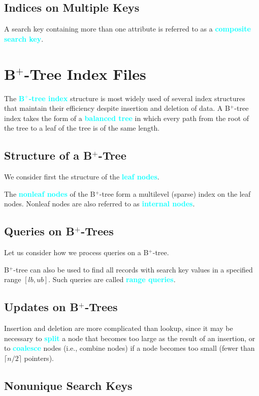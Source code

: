 \documentclass[a4paper,12pt,twoside,openany]{book}
\newcommand{\textcy}[1]{\textbf{\textcolor{cyan}{#1}}}
\begin{document}
\subsection{Indices on Multiple Keys}

A search key containing more than one attribute is referred to as a \textcy{composite search key}.

\section{B$^+$-Tree Index Files}

The \textcy{B$^+$-tree index} structure is most widely used of several index structures that maintain their efficiency despite insertion and deletion of data. A B$^+$-tree index takes the form of a \textcy{balanced tree} in which every path from the root of the tree to a leaf of the tree is of the same length.

\subsection{Structure of a B$^+$-Tree}

We consider first the structure of the \textcy{leaf nodes}.

The \textcy{nonleaf nodes} of the B$^+$-tree form a multilevel (sparse) index on the leaf nodes. Nonleaf nodes are also referred to as \textcy{internal nodes}.

\subsection{Queries on B$^+$-Trees}

Let us consider how we process queries on a B$^+$-tree.

B$^+$-tree can also be used to find all records with search key values in a specified range $[lb,ub]$. Such queries are called \textcy{range queries}.

\subsection{Updates on B$^+$-Trees}

Insertion and deletion are more complicated than lookup, since it may be necessary to \textcy{split} a node that becomes too large as the result of an insertion, or to \textcy{coalesce} nodes (i.e., combine nodes) if a node becomes too small (fewer than $\lceil n/2\rceil$ pointers).

\subsection{Nonunique Search Keys}
\end{document}
